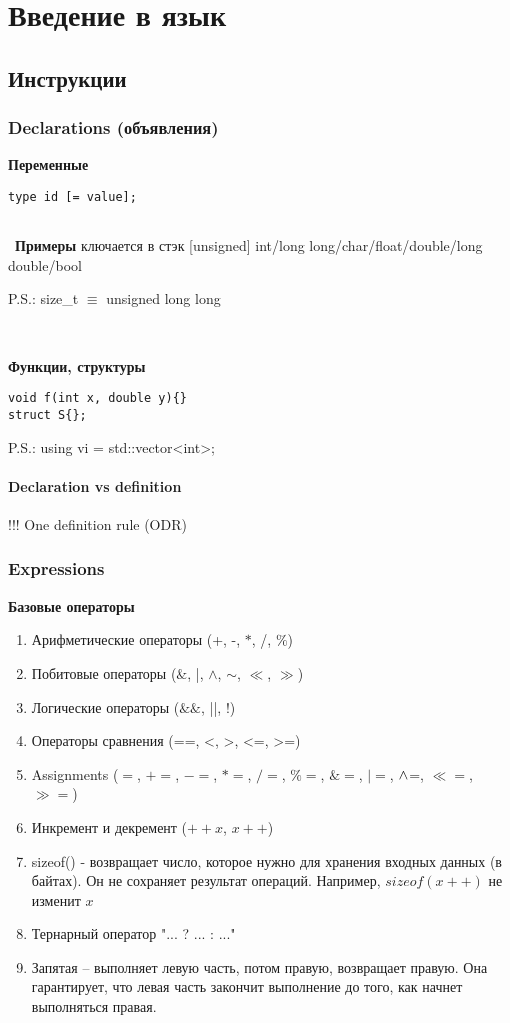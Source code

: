 \documentclass[12pt, a5paper]{article}
\begin{document}
\section{Введение в язык}
\subsection{Инструкции}

\subsubsection{Declarations (объявления)}

\textbf{Переменные}
\begin{lstlisting}
type id [= value];
	
\end{lstlisting}
\
\textbf{Примеры}
ключается в стэк
[unsigned] int/long long/char/float/double/long double/bool

P.S.: size\_t $\equiv$ unsigned long long

\

\textbf{Функции, структуры}

\begin{lstlisting}	
void f(int x, double y){}
struct S{};
\end{lstlisting}

P.S.: using vi = std::vector<int>;

\paragraph{Declaration vs definition}

!!! One definition rule (ODR)

\subsubsection{Expressions}

\textbf{Базовые операторы} 

\begin{enumerate}
	\item Арифметические операторы (+, -, $\ast$, /, $\%$) 
	\item Побитовые операторы ($\&$, |, $\wedge$, $\sim$, $\ll$, $\gg$)
	\item Логические операторы ($\&\&$, ||, !)
	\item Операторы сравнения (==, <, >, <=, >=)
	\item Assignments ($=$, $+=$, $-=$, $\ast=$, $/=$, $\%=$, $\&=$, $|=$, $\space\wedge$=, $\ll=$, $\gg=$)
	\item Инкремент и декремент ($++x$, $x++$)
	\item sizeof() - возвращает число, которое нужно для хранения входных данных (в байтах). Он не сохраняет результат операций. Например, $sizeof(x++)$ не изменит $x$
	\item Тернарный оператор "... ? ... : ..."
	\item Запятая -- выполняет левую часть, потом правую, возвращает правую. Она гарантирует, что левая часть закончит выполнение до того, как начнет выполняться правая. 
\end{enumerate} 
\end{document}
